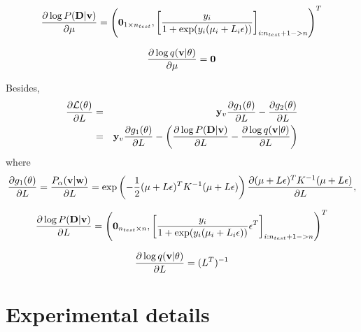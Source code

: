 \documentclass{article}
\def\v{{\bf v}}
\def\y{{\bf y}}
\def\w{{\bf w}}
\def\D{{\bf D}}
\begin{document}
\begin{eqnarray}
\setlength{\abovedisplayskip}{0pt}
\setlength{\belowdisplayskip}{0pt}
\nonumber
\frac{\partial \log P(\D|\v)}{\partial \mu} = \left( \mathbf{0}_{1 \times n_{test}}, \left [ \frac{y_i}{1+\exp(y_i(\mu_i+L_i\epsilon))} \right]_{i: n_{test}+1->n}  \right )^T
\end{eqnarray}




\begin{eqnarray}
\setlength{\abovedisplayskip}{0pt}
\setlength{\belowdisplayskip}{0pt}
\nonumber
\frac{\partial \log q(\v|\theta)}{\partial \mu} = \textbf{0}
\end{eqnarray}

Besides,
\begin{eqnarray}
\setlength{\abovedisplayskip}{0pt}
\setlength{\belowdisplayskip}{0pt}
\nonumber
\frac{\partial \mathcal{L}(\theta)}{\partial L} &=& \y_v \frac{\partial g_1(\theta)}{\partial L} - \frac{\partial g_2(\theta)}{\partial L} \\ \nonumber
&=& \y_v \frac{\partial g_1(\theta)}{\partial L} - \left( \frac{\partial \log P(\D|\v)}{\partial L} - \frac{\partial \log q(\v|\theta)}{\partial L} \right)
\end{eqnarray} where
\begin{eqnarray}
\setlength{\abovedisplayskip}{0pt}
\setlength{\belowdisplayskip}{0pt}
\nonumber
\frac{\partial g_1(\theta)}{\partial L} = \frac{P_{\alpha}(\v|\w)}{\partial L} = \exp\left(-\frac{1}{2}(\mu+L\epsilon)^T K^{-1} (\mu+L\epsilon)\right) \frac{\partial (\mu+L\epsilon)^T K^{-1} (\mu+L\epsilon)}{\partial L},
\end{eqnarray}

\begin{eqnarray}
\setlength{\abovedisplayskip}{0pt}
\setlength{\belowdisplayskip}{0pt}
\nonumber
\frac{\partial \log P(\D|\v)}{\partial L} = \left( \mathbf{0}_{n_{test}\times n}, \left[ \frac{y_i}{1+\exp(y_i(\mu_i+L_i\epsilon))} \epsilon^T \right]_{i: n_{test}+1->n}  \right )^T
\end{eqnarray}




\begin{eqnarray}
\setlength{\abovedisplayskip}{0pt}
\setlength{\belowdisplayskip}{0pt}
\nonumber
\frac{\partial \log q(\v|\theta)}{\partial L} = (L^T)^{-1}
\end{eqnarray}




\section{Experimental details}
\end{document}
